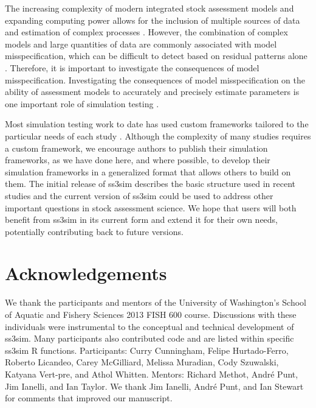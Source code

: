 \documentclass[10pt]{article}
\begin{document}
The increasing complexity of modern integrated stock assessment models and expanding computing power allows for the inclusion of multiple sources of data and estimation of complex processes \cite{maunder2013}. However, the combination of complex models and large quantities of data are commonly associated with model misspecification, which can be difficult to detect based on residual patterns alone \cite{maunder2013}. Therefore, it is important to investigate the consequences of model misspecification. Investigating the consequences of model misspecification on the ability of assessment models to accurately and precisely estimate parameters is one important role of simulation testing \cite{wilberg2006, deroba2013a, crone2013}.

Most simulation testing work to date has used custom frameworks tailored to the particular needs of each study \cite{helu2000, yin2004, magnusson2007, wetzel2011a, jiao2012, wilberg2006, deroba2013a, deroba2013, crone2013a, hurtadoferro2013}. Although the complexity of many studies requires a custom framework, we encourage authors to publish their simulation frameworks, as we have done here, and where possible, to develop their simulation frameworks in a generalized format that allows others to build on them. The initial release of ss3sim describes the basic structure used in recent studies \cite{johnson2013, ono2013} and the current version of ss3sim could be used to address other important questions in stock assessment science. We hope that users will both benefit from ss3sim in its current form and extend it for their own needs, potentially contributing back to future versions.

\section*{Acknowledgements}

We thank the participants and mentors of the University of Washington's School of Aquatic and Fishery Sciences 2013 FISH 600 course. Discussions with these individuals were instrumental to the conceptual and technical development of ss3sim. Many participants also contributed code and are listed within specific ss3sim R functions. Participants: Curry Cunningham, Felipe Hurtado-Ferro, Roberto Licandeo, Carey McGilliard, Melissa Muradian, Cody Szuwalski, Katyana Vert-pre, and Athol Whitten. Mentors: Richard Methot, Andr\'{e} Punt, Jim Ianelli, and Ian Taylor. We thank Jim Ianelli, Andr\'{e} Punt, and Ian Stewart for comments that improved our manuscript.
\end{document}

